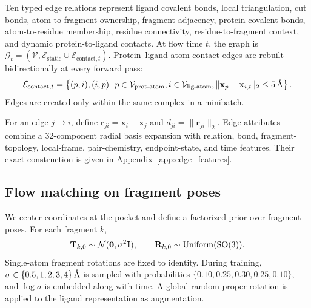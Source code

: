 Ten typed edge relations represent ligand covalent bonds, local
triangulation, cut bonds, atom-to-fragment ownership, fragment adjacency,
protein covalent bonds, atom-to-residue membership, residue connectivity,
residue-to-fragment context, and dynamic protein-to-ligand contacts.
At flow time \(t\), the graph is
\(\mathcal{G}_t=(\mathcal{V},\mathcal{E}_{\mathrm{static}}\cup
\mathcal{E}_{\mathrm{contact},t})\). Protein--ligand atom contact edges are
rebuilt bidirectionally at every forward pass:
\begin{equation}
    \mathcal{E}_{\mathrm{contact},t}
    =
    \left\{
    (p,i),(i,p)
    \,\middle|\,
    p\in\mathcal{V}_{\mathrm{prot\text{-}atom}},
    i\in\mathcal{V}_{\mathrm{lig\text{-}atom}},
    \|\mathbf{x}_{p}-\mathbf{x}_{i,t}\|_2\leq 5\,\text{\normalfont\AA}
    \right\}.
    \label{eq:dynamic_contacts}
\end{equation}
Edges are created only within the same complex in a minibatch.

For an edge \(j\rightarrow i\), define
\(\mathbf{r}_{ji}=\mathbf{x}_i-\mathbf{x}_j\) and
\(d_{ji}=\|\mathbf{r}_{ji}\|_2\). Edge attributes combine a 32-component
radial basis expansion with relation, bond, fragment-topology, local-frame,
pair-chemistry, endpoint-state, and time features. Their exact construction is
given in Appendix~\ref{app:edge_features}.

\subsection{Flow matching on fragment poses}
\label{sec:flow}

We center coordinates at the pocket and define a factorized prior over
fragment poses. For each fragment \(k\),
\begin{equation}
    \mathbf{T}_{k,0}
    \sim
    \mathcal{N}(\mathbf{0},\sigma^2\mathbf{I}),
    \qquad
    \mathbf{R}_{k,0}
    \sim
    \mathrm{Uniform}(\mathrm{SO}(3)).
    \label{eq:pose_prior}
\end{equation}
Single-atom fragment rotations are fixed to identity. During training,
\(\sigma\in\{0.5,1,2,3,4\}\,\text{\normalfont\AA}\) is sampled with probabilities
\(\{0.10,0.25,0.30,0.25,0.10\}\), and \(\log\sigma\) is embedded along with
time. A global random proper rotation is applied to the ligand representation
as augmentation.

